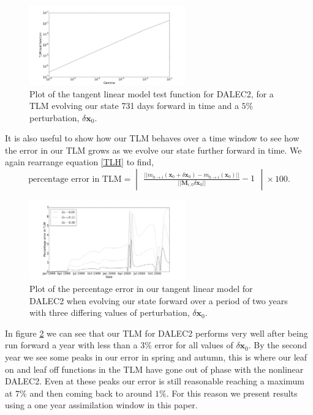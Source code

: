 \documentclass[11pt]{article}
\begin{document}
\begin{figure}[ht]
    \centering
    \includegraphics[width=0.6\textwidth]{testtlmer.png}
    \caption{Plot of the tangent linear model test function for DALEC2, for a TLM evolving our state 731 days forward in time and a $5\%$ perturbation, $\delta \textbf{x}_0$.}
    \label{fig:tlm}
\end{figure}

It is also useful to show how our TLM behaves over a time window to see how the error in our TLM grows as we evolve our state further forward in time. We again rearrange equation \ref{TLH} to find, 
\begin{equation}
\text{percentage error in TLM} = \begin{vmatrix} \frac{||m_{0\rightarrow i}(\mathbf{x}_0+\delta\mathbf{x}_0) - m_{0 \rightarrow i}(\mathbf{x}_0)||}{|| \mathbf{M}_{i,0}\delta\mathbf{x}_0||} - 1 \end{vmatrix} \times 100.
\end{equation}

\begin{figure}[ht]
    \centering
    \includegraphics[width=0.6\textwidth]{tlm_error.png}
    \caption{Plot of the percentage error in our tangent linear model for DALEC2 when evolving our state forward over a period of two years with three differing values of perturbation, $\delta \textbf{x}_0$.}
    \label{fig:tlm_error}
\end{figure}

In figure \ref{fig:tlm_error} we can see that our TLM for DALEC2 performs very well after being run forward a year with less than a $3\%$ error for all values of $\delta \textbf{x}_0$. By the second year we see some peaks in our error in spring and autumn, this is where our leaf on and leaf off functions in the TLM have gone out of phase with the nonlinear DALEC2. Even at these peaks our error is still reasonable reaching a maximum at $7\%$ and then coming back to around $1\%$. For this reason we present results using a one year assimilation window in this paper. 
\end{document}
